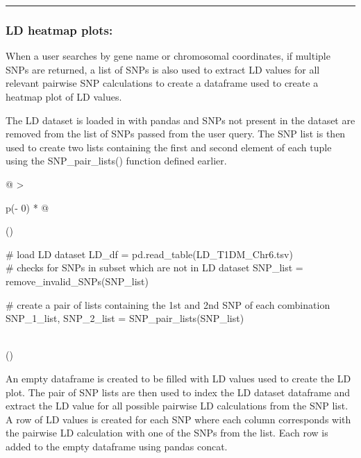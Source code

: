 \documentclass[12pt,a4paper]{article}
\begin{document}
{}

\begin{center}\rule{0.5\linewidth}{0.5pt}\end{center}

\hypertarget{h.tm8mndqz55x9}{%
\subsubsection{\texorpdfstring{{}}{}}\label{h.tm8mndqz55x9}}

\hypertarget{h.hebu2brlzmob}{%
\subsubsection{\texorpdfstring{{LD heatmap
plots:}}{LD heatmap plots:}}\label{h.hebu2brlzmob}}

{When a user searches by gene name or chromosomal coordinates, if
multiple SNPs are returned, a list of SNPs is also used to extract LD
values for all relevant pairwise SNP calculations to create a dataframe
used to create a heatmap plot of LD values.}

{The LD dataset is loaded in with pandas and SNPs not present in the
dataset are removed from the list of SNPs passed from the user query.
The SNP list is then used to create two lists containing the first and
second element of each tuple using the SNP\_pair\_lists() function
defined earlier.}

\protect\hypertarget{t.37287ca283631a102efe72ff61cf4610e2d4e853}{}{}\protect\hypertarget{t.14}{}{}

\begin{longtable}[]{@{}
  >{\raggedright\arraybackslash}p{(\columnwidth - 0\tabcolsep) * }@{}}
\toprule()
\endhead
\begin{minipage}[t]{\linewidth}\raggedright
{\# load LD dataset}{\hfill\break
LD\_df =
pd.read\_table(}{\textquotesingle LD\_T1DM\_Chr6.tsv\textquotesingle{}}{)\\
}{\# checks for SNPs in subset which are not in LD dataset}{\hfill\break
SNP\_list = remove\_invalid\_SNPs(SNP\_list)}

{\# create a pair of lists containing the 1st and 2nd SNP of each
combination}{\hfill\break
SNP\_1\_list, SNP\_2\_list = SNP\_pair\_lists(SNP\_list)}\strut
\end{minipage} \\
\bottomrule()
\end{longtable}

{}

{An empty dataframe is created to be filled with LD values used to
create the LD plot. The pair of SNP lists are then used to index the LD
dataset dataframe and extract the LD value for all possible pairwise LD
calculations from the SNP list. A row of LD values is created for each
SNP where each column corresponds with the pairwise LD calculation with
one of the SNPs from the list. Each row is added to the empty dataframe
using pandas concat.}
\end{document}
